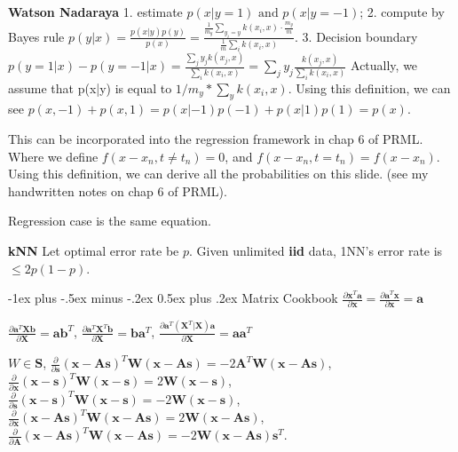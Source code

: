 \documentclass[10pt,landscape]{article}
\makeatletter
\newcommand{\vect}[1]{\boldsymbol{#1}}
\renewcommand{\section}{\@startsection{section}{1}{0mm}%
                                {-1ex plus -.5ex minus -.2ex}%
                                {0.5ex plus .2ex}%
                                {\normalfont\large\bfseries}}
\makeatother
\begin{document}
\begin{multicols}{3}
\textbf{Watson Nadaraya} 1. estimate $p(x|y=1) \text{ and } p(x|y=-1)$; 2. compute by Bayes rule $p(y|x) = \frac{p(x|y) p(y)}{p(x)} =  \frac{\frac{1}{m_y} \sum_{y_i = y} k(x_i, x) \cdot \frac{m_y}{m}}  {\frac{1}{m} \sum_i k(x_i, x)}$. 3. Decision boundary $p(y=1|x) - p(y=-1|x) = 
  \frac{\sum_j y_j k(x_j, x)}
  {\sum_i k(x_i, x)} =
\sum_j y_j \frac{k(x_j,x)}{\sum_i k(x_i, x)}$ Actually, we assume that p(x|y) is equal to $1/m_y * \sum_y k(x_i,x)$. Using this definition, we can see $p(x,-1) + p(x,1) = p(x|-1)p(-1)+p(x|1)p(1) = p(x)$.

This can be incorporated into the regression framework in chap 6 of PRML. Where we define $f(x-x_n, t\neq t_n) = 0$, and $f(x-x_n, t=t_n) = f(x-x_n)$. Using this definition, we can derive all the probabilities on this slide. (see my handwritten notes on chap 6 of PRML).

Regression case is the same equation.

\textbf{kNN} Let optimal error rate be $p$. Given unlimited \textbf{iid} data, 1NN's error rate is $\leq 2p(1-p)$.


\section{Matrix Cookbook}
$\frac{\partial \vect{x}^T \vect{a} }{\partial \vect{x}} = \frac{\partial \vect{a}^T \vect{x} }{\partial \vect{x}} = \vect{a}$

$\frac{\partial \vect{a}^T \vect{X} \vect{b}  }{\partial \vect{X}} = \vect{a}\vect{b}^T$, $\frac{\partial \vect{a}^T \vect{X}^T \vect{b}  }{\partial \vect{X}} = \vect{b}\vect{a}^T$, $\frac{\partial \vect{a}^T (\vect{X}^T|\vect{X}) \vect{a}  }{\partial \vect{X}} = \vect{a}\vect{a}^T$

$W \in \vect{S} $, 
$\frac{\partial}{\partial \vect{s} } (\vect{x} - \vect{A}\vect{s})^T \vect{W} (\vect{x} - \vect{A}\vect{s}) = -2\vect{A}^T \vect{W} (\vect{x} - \vect{A}\vect{s})$, 
$\frac{\partial}{\partial \vect{x} } (\vect{x} - \vect{s})^T \vect{W} (\vect{x} - \vect{s}) = 2 \vect{W} (\vect{x} - \vect{s})$, 
$\frac{\partial}{\partial \vect{s} } (\vect{x} - \vect{s})^T \vect{W} (\vect{x} - \vect{s}) = -2 \vect{W} (\vect{x} - \vect{s})$, 
$\frac{\partial}{\partial \vect{x} } (\vect{x} - \vect{A}\vect{s})^T \vect{W} (\vect{x} - \vect{A}\vect{s}) = 2\vect{W} (\vect{x} - \vect{A}\vect{s})$, 
$\frac{\partial}{\partial \vect{A} } (\vect{x} - \vect{A}\vect{s})^T \vect{W} (\vect{x} - \vect{A}\vect{s}) = -2 \vect{W} (\vect{x} - \vect{A}\vect{s})\vect{s}^T$.


\end{multicols}
\end{document}
